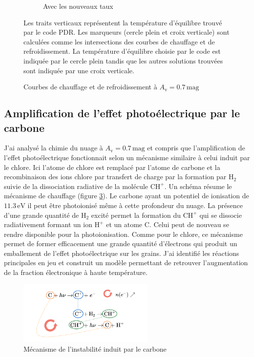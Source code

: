 \begin{figure}[!h]
\begin{subfigure}[t]{0.49\textwidth}
        \caption{Avec les nouveaux taux}
         \label{fig:H2:Bossion:cooling}
    \end{subfigure}
    \caption{Courbes de chauffage et de refroidissement à $A_\mathrm{v}=0.7\,\mathrm{mag}$}
    \begin{minipage}{\textwidth}
    Les traits verticaux représentent la température d'équilibre trouvé par le code PDR. Les marqueurs (cercle plein et croix verticale) sont calculées comme les intersections des courbes de chauffage et de refroidissement. La température d'équilibre choisie par le code est indiquée par le cercle plein tandis que les autres solutions trouvées sont indiquée par une croix verticale.
    \end{minipage}
\end{figure}


\subsection{Amplification de l'effet photoélectrique par le carbone}

J'ai analysé la chimie du nuage à $A_\mathrm{v} = 0.7\,\mathrm{mag}$ et compris que l'amplification de l'effet photoélectrique fonctionnait selon un mécanisme similaire à celui induit par le chlore. Ici l'atome de chlore est remplacé par l'atome de carbone et la recombinaison des ions chlore par transfert de charge par la formation par $\mathrm{H}_2$ suivie de la dissociation radiative de la molécule $\mathrm{CH}^+$. Un schéma résume le mécanisme de chauffage (figure \ref{fig:H2:meca:C}). Le carbone ayant un potentiel de ionisation de $11.3\,\mathrm{eV}$ il peut être photoionisé même à cette profondeur du nuage. La présence d'une grande quantité de $\mathrm{H}_2$ excité permet la formation du $\mathrm{CH}^+$ qui se dissocie radiativement formant un ion $\mathrm{H}^+$ et un atome $\mathrm{C}$. Celui peut de nouveau se rendre disponible pour la  photoionisation. Comme pour le chlore, ce mécanisme permet de former efficacement une grande quantité d'électrons qui produit un emballement de l'effet photoélectrique sur les grains. J'ai identifié les réactions principales en jeu et construit un modèle permettant de retrouver l'augmentation de la fraction électronique à haute température.

\begin{figure}[!h]
    \centering \includegraphics[trim = {0 0 0 1cm},clip,width=0.6\textwidth]{figure/H2/pic/scheme_pic.png}
    \caption{Mécanisme de l'instabilité induit par le carbone}
    \label{fig:H2:meca:C}
\end{figure}


